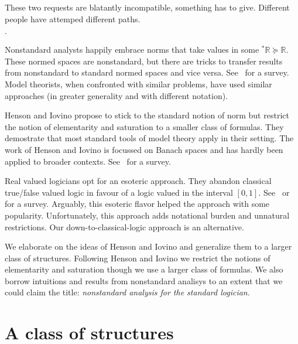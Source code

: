 \documentclass[10pt,oneside]{amsproc}
\newcommand{\mylabel}[1]{{#1}\hfill}
\renewenvironment{itemize}
  {\begin{list}{$\cdot$}{%
  \setlength{\parskip}{0mm}
  \setlength{\topsep}{.4\baselineskip}
  \setlength{\rightmargin}{0mm}
  \setlength{\listparindent}{0mm}
  \setlength{\itemindent}{0mm}
  \setlength{\labelwidth}{3ex}
  \setlength{\itemsep}{.2\baselineskip}
  \setlength{\parsep}{.2\baselineskip}
  \setlength{\partopsep}{0mm}
  \setlength{\labelsep}{1ex}
  \setlength{\leftmargin}{\labelwidth+\labelsep}
  \let\makelabel\mylabel}}{%
\end{list}}
\begin{document}
These two requests are blatantly incompatible, something has to give.
Different people have attemped different paths.
\begin{itemize}
  \item[1.] Nonstandard analysts happily embrace norms that take values in some ${}^*\mathds{R}\succeq\mathds{R}$.
  These normed spaces are nonstandard, but there are tricks to transfer results from nonstandard to standard normed spaces and vice versa. See~\cite{G} for a survey.
  Model theorists, when confronted with similar problems, have used similar approaches (in greater generality and with different notation).
  \item[2.] Henson and Iovino propose to stick to the standard notion of norm but restrict the notion of elementarity and saturation to a smaller class of formulas.
  They demostrate that most standard tools of model theory apply in their setting. 
  The work of Henson and Iovino is focussed on Banach spaces and has hardly been applied to broader contexts. See~\cite{HI} for a survey.
  \item[3.] Real valued logicians opt for an esoteric approach.
  They abandon classical true/false valued logic in favour of a logic valued in the interval $[0,1]$.
  See~\cite{K} or~\cite{H} for a survey.
  Arguably, this esoteric flavor helped the approach with some popularity. 
  Unfortunately, this approach adds notational burden and unnatural restrictions.
  Our down-to-classical-logic approach is an alternative.
\end{itemize}

We elaborate on the ideas of Henson and Iovino and generalize them to a larger class of structures.
Following Henson and Iovino we restrict the notions of elementarity and saturation though we use a larger class of formulas.
We also borrow intuitions and results from nonstandard analisys to an extent that we could claim the title: \textit{nonstandard analysis for the standard logician}.

\section{A class of structures}\label{uno}
\end{document}
